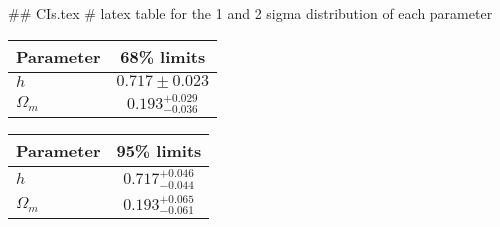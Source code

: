 ## CIs.tex
# latex table for the 1 and 2 sigma distribution of each parameter

\begin{tabular} { l  c}
 Parameter &  68\% limits\\
\hline
{\boldmath$h              $} & $0.717\pm 0.023            $\\
{\boldmath$\Omega_m       $} & $0.193^{+0.029}_{-0.036}   $\\
\hline
\end{tabular}

\begin{tabular} { l  c}
 Parameter &  95\% limits\\
\hline
{\boldmath$h              $} & $0.717^{+0.046}_{-0.044}   $\\
{\boldmath$\Omega_m       $} & $0.193^{+0.065}_{-0.061}   $\\
\hline
\end{tabular}
